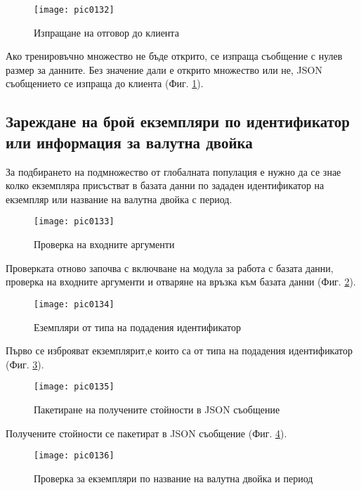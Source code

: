 \begin{figure}[h]
  \centering
  \texttt{[image: pic0132]}
  \caption{Изпращане на отговор до клиента}
\label{fig:pic0132}
\end{figure}
\FloatBarrier

Ако тренировъчно множество не бъде открито, се изпраща съобщение с нулев размер за данните. Без значение дали е открито множество или не, JSON съобщението се изпраща до клиента (Фиг. \ref{fig:pic0132}).

\subsection{Зареждане на брой екземпляри по идентификатор или информация за валутна двойка}

За подбирането на подмножество от глобалната популация е нужно да се знае колко екземпляра присъстват в базата данни по зададен идентификатор на екземпляр или название на валутна двойка с период. 

\begin{figure}[h]
  \centering
  \texttt{[image: pic0133]}
  \caption{Проверка на входните аргументи}
\label{fig:pic0133}
\end{figure}
\FloatBarrier

Проверката отново започва с включване на модула за работа с базата данни, проверка на входните аргументи и отваряне на връзка към базата данни (Фиг. \ref{fig:pic0133}).

\begin{figure}[h]
  \centering
  \texttt{[image: pic0134]}
  \caption{Еземпляри от типа на подадения идентификатор}
\label{fig:pic0134}
\end{figure}
\FloatBarrier

Първо се изброяват екземплярит,е които са от типа на подадения идентификатор (Фиг. \ref{fig:pic0134}).

\begin{figure}[h]
  \centering
  \texttt{[image: pic0135]}
  \caption{Пакетиране на получените стойности в JSON съобщение}
\label{fig:pic0135}
\end{figure}
\FloatBarrier

Получените стойности се пакетират в JSON съобщение (Фиг. \ref{fig:pic0135}). 

\begin{figure}[h]
  \centering
  \texttt{[image: pic0136]}
  \caption{Проверка за екземпляри по название на валутна двойка и период}
\label{fig:pic0136}
\end{figure}
\FloatBarrier

